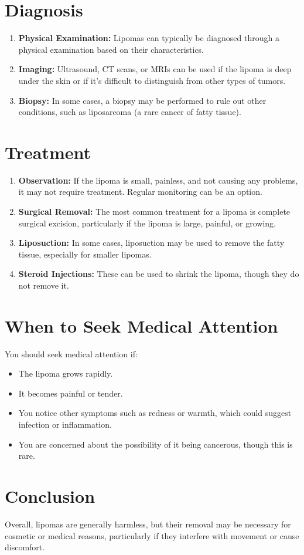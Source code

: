 \documentclass{article}
\begin{document}
\section{Diagnosis}
\begin{enumerate}
    \item \textbf{Physical Examination:} Lipomas can typically be diagnosed through a physical examination based on their characteristics.
    \item \textbf{Imaging:} Ultrasound, CT scans, or MRIs can be used if the lipoma is deep under the skin or if it’s difficult to distinguish from other types of tumors.
    \item \textbf{Biopsy:} In some cases, a biopsy may be performed to rule out other conditions, such as liposarcoma (a rare cancer of fatty tissue).
\end{enumerate}

\section{Treatment}
\begin{enumerate}
    \item \textbf{Observation:} If the lipoma is small, painless, and not causing any problems, it may not require treatment. Regular monitoring can be an option.
    \item \textbf{Surgical Removal:} The most common treatment for a lipoma is complete surgical excision, particularly if the lipoma is large, painful, or growing.
    \item \textbf{Liposuction:} In some cases, liposuction may be used to remove the fatty tissue, especially for smaller lipomas.
    \item \textbf{Steroid Injections:} These can be used to shrink the lipoma, though they do not remove it.
\end{enumerate}

\section{When to Seek Medical Attention}
You should seek medical attention if:
\begin{itemize}
    \item The lipoma grows rapidly.
    \item It becomes painful or tender.
    \item You notice other symptoms such as redness or warmth, which could suggest infection or inflammation.
    \item You are concerned about the possibility of it being cancerous, though this is rare.
\end{itemize}

\section{Conclusion}
Overall, lipomas are generally harmless, but their removal may be necessary for cosmetic or medical reasons, particularly if they interfere with movement or cause discomfort.
\end{document}
